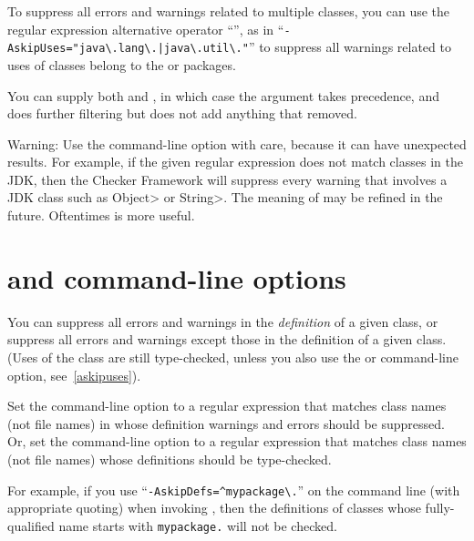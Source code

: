 To suppress all errors and warnings related to multiple classes, you can use
the regular expression alternative operator ``\code{|}'', as in
``{\codesize\verb+-AskipUses="java\.lang\.|java\.util\."+}'' to suppress
all warnings related to uses of classes belong to the  or
 packages.

You can supply both  and , in which case
the  argument takes precedence, and  does
further filtering but does not add anything that  removed.

Warning:  Use the  command-line option with care,
because it can have unexpected results.  For example, if the
given regular expression does not match classes in the JDK, then the
Checker Framework will suppress every warning that involves a JDK class
such as \<Object> or \<String>.  The meaning of  may be
refined in the future.  Oftentimes  is more useful.



\section{ and  command-line options\label{askipdefs}}

You can suppress all errors and warnings in the \emph{definition} of a given
class, or suppress all errors and warnings except those in the definition
of a given class.  (Uses of the class are still type-checked, unless you also use
the  or  command-line option,
see~\ref{askipuses}).

Set the  command-line option to a
regular expression that matches class names (not file names) in whose definition warnings and errors
should be suppressed.
Or, set the  command-line option to a
regular expression that matches class names (not file names) whose
definitions should be type-checked.

For example, if you use
``{\codesize\verb|-AskipDefs=^mypackage\.|}'' on the command line
(with appropriate quoting) when invoking
, then the definitions of
classes whose fully-qualified name starts with \codesize\verb|mypackage.|
will not be checked.

